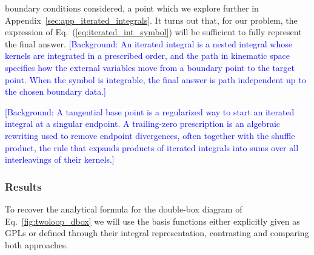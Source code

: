 \documentclass[a4paper,11pt]{article}
\begin{document}
boundary conditions considered, a point which we explore further in Appendix~\ref{sec:app_iterated_integrals}. It turns out that, for our problem, the expression of Eq.~(\ref{eq:iterated_int_symbol}) will be sufficient to fully represent the final answer.
\textcolor{blue}{\small [Background: An iterated integral is a nested integral whose kernels are integrated in a prescribed order, and the path in kinematic space specifies how the external variables move from a boundary point to the target point. When the symbol is integrable, the final answer is path independent up to the chosen boundary data.]}

\textcolor{blue}{\small [Background: A tangential base point is a regularized way to start an iterated integral at a singular endpoint. A trailing-zero prescription is an algebraic rewriting used to remove endpoint divergences, often together with the shuffle product, the rule that expands products of iterated integrals into sums over all interleavings of their kernels.]}


\subsubsection{Results}
To recover the analytical formula for the double-box diagram of Eq.~\eqref{fig:twoloop_dbox} we will use the basis functions either explicitly given as GPLs or defined through their integral representation, contrasting and comparing both approaches.
\end{document}
